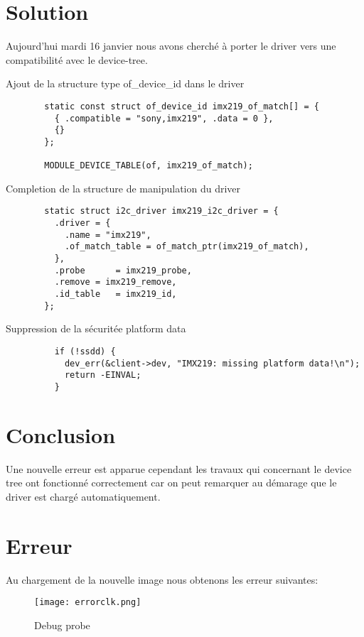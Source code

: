 \section{Solution}
Aujourd'hui mardi 16 janvier nous avons cherché à porter le driver vers
une compatibilité avec le device-tree.
\begin{description}
  \item[Ajout de la structure type of\_device\_id dans le driver]
  \begin{lstlisting}
  static const struct of_device_id imx219_of_match[] = {
    { .compatible = "sony,imx219", .data = 0 },
    {}
  };
   
  MODULE_DEVICE_TABLE(of, imx219_of_match);
  \end{lstlisting}

  \item[Completion de la structure de manipulation du driver]
  \begin{lstlisting}
  static struct i2c_driver imx219_i2c_driver = {
    .driver = {
      .name = "imx219",
      .of_match_table = of_match_ptr(imx219_of_match),
    },
    .probe		= imx219_probe,
    .remove	= imx219_remove,
    .id_table	= imx219_id,
  };
  \end{lstlisting}

  \item[Suppression de la sécuritée platform data]
  \begin{lstlisting}
    if (!ssdd) {
      dev_err(&client->dev, "IMX219: missing platform data!\n");
      return -EINVAL;
    }
    \end{lstlisting}
\end{description}

\section{Conclusion}
Une nouvelle erreur est apparue cependant les travaux qui concernant le 
device tree ont fonctionné correctement car on peut remarquer au démarage
que le driver est chargé automatiquement.

\section{Erreur}
Au chargement de la nouvelle image nous obtenons les erreur suivantes:

\begin{figure}[th]
  \centering
  \texttt{[image: errorclk.png]}
  \decoRule
  \caption{Debug probe}  \label{fig:planning}
\end{figure}

